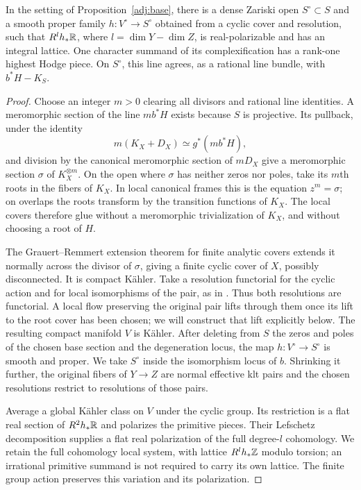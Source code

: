\begin{lemma}
\label{adj:root}
In the setting of Proposition~\ref{adj:base}, there is a dense Zariski open
$S^\circ\subset S$ and a smooth proper family $h:V^\circ\to S^\circ$ obtained
from a cyclic cover and resolution, such that $R^l h_*\mathbb R$, where
$l=\dim Y-\dim Z$, is real-polarizable and has an integral lattice.
One character summand of its complexification has a rank-one highest
Hodge piece.  On $S^\circ$, this line agrees, as a rational line bundle,
with $b^*H-K_S$.
\end{lemma}

\begin{proof}
Choose an integer $m>0$ clearing all divisors and rational line identities.
A meromorphic section of the line $m b^*H$ exists because $S$ is projective.
Its pullback, under the identity
\[
                m(K_X+D_X)\simeq g^*(m b^*H),
\]
and division by the canonical meromorphic section of $mD_X$ give a
meromorphic section $\sigma$ of $K_X^{\otimes m}$.
On the open where $\sigma$ has neither zeros nor poles, take its $m$th
roots in the fibers of $K_X$.  In local canonical frames this is the
equation $z^m=\sigma$; on overlaps the roots transform by the transition
functions of $K_X$.  The local covers therefore glue without a
meromorphic trivialization of $K_X$, and without choosing a root of $H$.

The Grauert--Remmert extension theorem for finite analytic covers
\cite[Exposé~XII, Proposition~5.3 and Theorem~5.4]{SGA1} extends it
normally across the divisor of $\sigma$, giving a finite cyclic cover
of $X$, possibly disconnected.  It is compact K\"ahler.
Take a resolution functorial for the cyclic action and for local
isomorphisms of the pair, as in \cite[Section~1.1 and Lemma~1.1]{Ambro}.
Thus both resolutions are functorial.  A local flow preserving the
original pair lifts through them once its lift to the root cover has
been chosen; we will construct that lift explicitly below.
The resulting compact manifold $V$ is K\"ahler.  After deleting from $S$ the zeros and
poles of the chosen base section and the degeneration locus, the map
$h:V^\circ\to S^\circ$ is smooth and proper.  We take $S^\circ$
inside the isomorphism locus of $b$.  Shrinking it further, the original
fibers of $Y\to Z$ are normal effective klt pairs and the chosen
resolutions restrict to resolutions of those pairs.

Average a global K\"ahler class on $V$ under the cyclic group.  Its
restriction is a flat real section of $R^2h_*\mathbb R$ and polarizes the
primitive pieces.  Their Lefschetz decomposition supplies a flat real
polarization of the full degree-$l$ cohomology.  We retain the full
cohomology local system, with lattice $R^lh_*\mathbb Z$ modulo torsion; an
irrational primitive summand is not required to carry its own lattice.
The finite group action preserves this variation and its polarization.


\end{proof}
